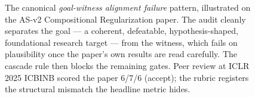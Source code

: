 \begin{figure}[t]
\caption{The canonical \emph{goal-witness alignment failure} pattern, illustrated
on the AS-v2 Compositional Regularization paper. The audit cleanly separates
the goal --- a coherent, defeatable, hypothesis-shaped, foundational
research target --- from the witness, which fails on plausibility once the
paper's own results are read carefully. The cascade rule then blocks the
remaining gates. Peer review at ICLR 2025 ICBINB scored the paper 6/7/6
(accept); the rubric registers the structural mismatch the headline metric
hides.}
\label{fig:goal_witness_failure}
\end{figure}
